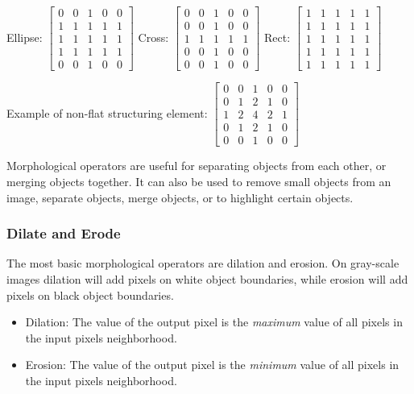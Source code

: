 \noindent Ellipse: 
$\begin{bmatrix}
    0 & 0 & 1 & 0 & 0 \\
    1 & 1 & 1 & 1 & 1 \\
    1 & 1 & 1 & 1 & 1 \\
    1 & 1 & 1 & 1 & 1 \\
    0 & 0 & 1 & 0 & 0
\end{bmatrix}$ 
Cross: 
$\begin{bmatrix}
    0 & 0 & 1 & 0 & 0 \\
    0 & 0 & 1 & 0 & 0 \\
    1 & 1 & 1 & 1 & 1 \\
    0 & 0 & 1 & 0 & 0 \\
    0 & 0 & 1 & 0 & 0 
\end{bmatrix}$
Rect: 
$\begin{bmatrix}
    1 & 1 & 1 & 1 & 1 \\
    1 & 1 & 1 & 1 & 1 \\
    1 & 1 & 1 & 1 & 1 \\
    1 & 1 & 1 & 1 & 1 \\
    1 & 1 & 1 & 1 & 1
\end{bmatrix}$

Example of non-flat structuring element:
$\begin{bmatrix}
    0 & 0 & 1 & 0 & 0 \\
    0 & 1 & 2 & 1 & 0 \\
    1 & 2 & 4 & 2 & 1 \\
    0 & 1 & 2 & 1 & 0 \\
    0 & 0 & 1 & 0 & 0
\end{bmatrix}$ 

Morphological operators are useful for separating objects from each other, or merging objects together. It can also be used to remove small objects from an image, separate objects, merge objects, or to highlight certain objects.


\subsubsection{Dilate and Erode}
The most basic morphological operators are dilation and erosion. On gray-scale images dilation will add pixels on white object boundaries, while erosion will add pixels on black object boundaries.
\begin{itemize}
    \item Dilation: The value of the output pixel is the \textit{maximum} value of all pixels in the input pixels neighborhood. 
    \item Erosion: The value of the output pixel is the \textit{minimum} value of all pixels in the input pixels neighborhood. \cite{website:mathworks_dilation_erosion}
\end{itemize}

